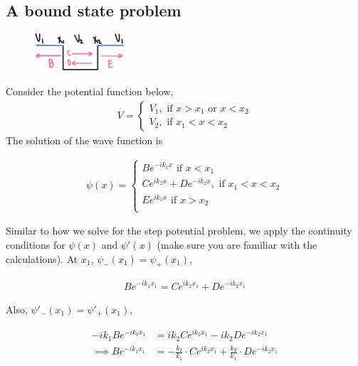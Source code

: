 \documentclass[12pt]{book} %
\numberwithin{equation}{chapter}
\begin{document}
\subsection*{A bound state problem}
\begin{figure}
\hspace{-3cm}
\centering
\includegraphics[width=0.3\textwidth]{A bound state problem}
\end{figure}
Consider the potential function below,
\begin{align*}
V=
\begin{cases}
V_{1},\text{ if }x>x_{1}\text{ or }x<x_{2}\\
V_{2},\text{ if }x_{1}<x<x_{2}
\end{cases}
\end{align*}
The solution of the wave function is
\begin{eqnbox}
\begin{align}
\psi(x)=
\begin{cases}
Be^{-ik_{1}x}\text{ if }x<x_{1}\\
Ce^{ik_{2}x}+De^{-ik_{2}x}, \text{ if }x_{1}<x<x_{2}\\
Ee^{ik_{1}x}\text{ if }x>x_{2}\\
\end{cases}
\end{align}
\end{eqnbox}
Similar to how we solve for the step potential problem, we apply the continuity conditions for $\psi(x)$ and $\psi'(x)$ (make sure you are familiar with the calculations).\bigskip\newline
At $x_{1}$, $\psi_{-}(x_{1})=\psi_{+}(x_{1})$,
\begin{eqnbox}
\begin{align}
Be^{-ik_{1}x_{1}}=Ce^{ik_{2}x_{1}}+De^{-ik_{2}x_{1}}
\end{align}
\end{eqnbox}
Also, $\psi'_{-}(x_{1})=\psi'_{+}(x_{1})$,
\begin{eqnbox}
\begin{align}
-ik_{1}Be^{-ik_{1}x_{1}}&=ik_{2}Ce^{ik_{2}x_{1}}-ik_{2}De^{-ik_{2}x_{1}}\nonumber\\
\implies Be^{-ik_{1}x_{1}}&=-\frac{k_{2}}{k_{1}}\cdot Ce^{ik_{2}x_{1}}+\frac{k_{2}}{k_{1}}\cdot De^{-ik_{2}x_{1}}
\end{align}
\end{eqnbox}
\end{document}
